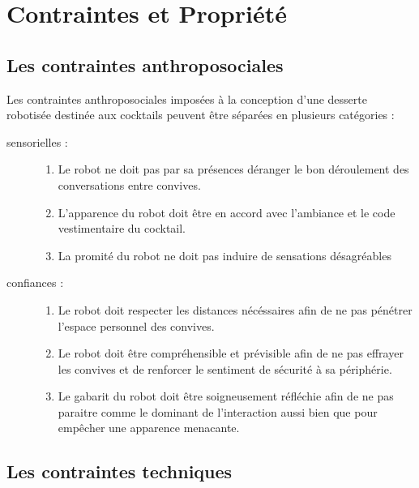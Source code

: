 \chapter{Contraintes et Propriété}

\section{Les contraintes anthroposociales}

Les contraintes anthroposociales imposées à la conception d'une desserte robotisée destinée aux cocktails peuvent être séparées en plusieurs catégories :
\begin{description}
\item[sensorielles :]
  \begin{enumerate}
  \item Le robot ne doit pas par sa présences déranger le bon déroulement des conversations entre convives.
  \item L'apparence du robot doit être en accord avec l'ambiance et le code vestimentaire du cocktail.
  \item La promité du robot ne doit pas induire de sensations désagréables
  \end{enumerate}
\item[confiances :]
  \begin{enumerate}
  \item Le robot doit respecter les distances nécéssaires afin de ne pas pénétrer l'espace personnel des convives.
  \item Le robot doit être compréhensible et prévisible afin de ne pas effrayer les convives et de renforcer le sentiment de sécurité à sa périphérie.
  \item Le gabarit du robot doit être soigneusement réfléchie afin de ne pas paraitre comme le dominant de l'interaction aussi bien que pour empêcher une apparence menacante.
  \end{enumerate}
\end{description}




\section{Les contraintes techniques}


